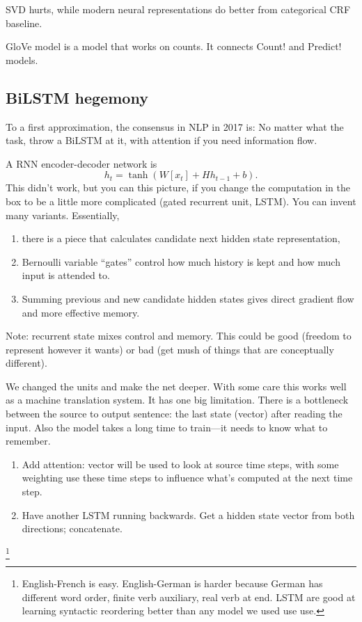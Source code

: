 
SVD hurts, while modern neural representations do better from categorical CRF baseline.

GloVe model is a model that works on counts. It connects Count! and Predict! models.

\subsection{BiLSTM hegemony}

To a first approximation, the consensus in NLP in 2017 is:
No matter what the task, throw a BiLSTM at it, with attention if you need information flow.

A RNN encoder-decoder network is
$$
h_t=\tanh(W[x_t] + Hh_{t-1} + b).
$$
This didn't work, but you can this picture, if you change the computation in the box to be a little more complicated (gated recurrent unit, LSTM). You can invent many variants.
Essentially, 
\begin{enumerate}
\item
there is a piece that calculates candidate next hidden state representation,
\item Bernoulli variable ``gates'' control how much history is kept and how much input is attended to. 
\item
Summing previous and new candidate hidden states gives direct gradient flow and more effective memory.
\end{enumerate}
Note: recurrent state mixes control and memory. This could be good (freedom to represent however it wants) or bad (get mush of things that are conceptually different).

We changed the units and make the net deeper. With some care this works well as a machine translation system. It has one big limitation. There is a bottleneck between the source to output sentence: the last state (vector) after reading the input. Also the model takes a long time to train---it needs to know what to remember.

\begin{enumerate}
\item
Add attention: vector will be used to look at source time steps, with some weighting use these time steps to influence what's computed at the next time step.
\item
Have another LSTM running backwards. 
Get a hidden state vector from both directions; concatenate.
\end{enumerate}
\footnote{
English-French is easy.
English-German is harder because German has different word order, finite verb auxiliary, real verb at end. 
LSTM are good at learning syntactic reordering better than any model we used use use.}

